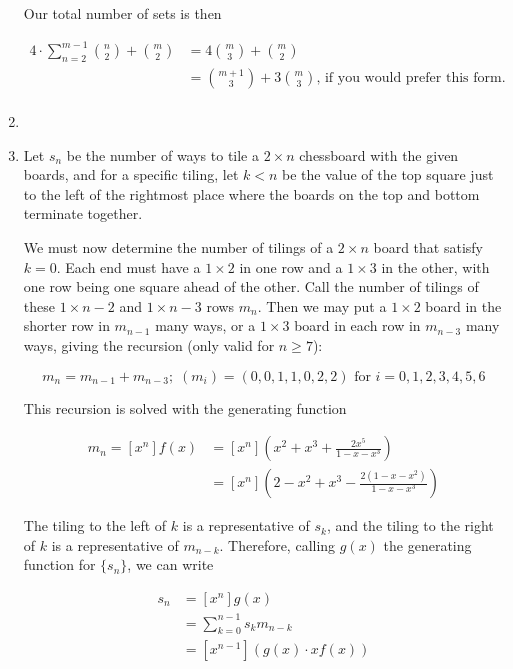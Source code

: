 \documentclass{book}
\numberwithin{equation}{section}
\begin{document}
\begin{enumerate}[label={9.\arabic*}]
Our total number of sets is then

\begin{align*}
4 \cdot \sum_{n = 2}^{m-1} {n \choose 2} + {m \choose 2} & = 4{m \choose 3} + {m \choose 2} \\
& = {m + 1 \choose 3} + 3{m \choose 3} \text{, if you would prefer this form.} \\
\end{align*}

\item

\item


Let $s_n$ be the number of ways to tile a $2 \times n$ chessboard with the given boards, and for a specific tiling,
let $k < n$ be the value of the top square just to the left of the rightmost place where the boards on the top
and bottom terminate together.

We must now determine the number of tilings of a $2 \times n$ board that satisfy $k=0$.
Each end must have a $1 \times 2$ in one row and a $1 \times 3$ in the other,
with one row being one square ahead of the other. Call the number of tilings of these $1 \times n-2$ and
$1 \times n-3$ rows $m_n$. Then we may put a $1 \times 2$ board in the shorter row in $m_{n-1}$ many ways,
or a $1 \times 3$ board in each row in $m_{n-3}$ many ways, giving the recursion (only valid for $n \geq 7$):

$$m_n = m_{n-1} + m_{n-3}; \; (m_i) = (0, 0, 1, 1, 0, 2, 2) \text{ for } i = 0, 1, 2, 3, 4, 5, 6$$

This recursion is solved with the generating function

\begin{align*}
m_n = [x^n]f(x) & = [x^n]\left(x^2 + x^3 + \frac{2x^5}{1 - x - x^3}\right) \\
& = [x^n]\left(2 - x^2 + x^3 - \frac{2(1 - x - x^2)}{1 - x - x^3}\right)
\end{align*}

The tiling to the left of $k$ is a representative of $s_k$, and the tiling to the right of $k$ is a representative of
$m_{n-k}$. Therefore, calling $g(x)$ the generating function for $\{ s_n \}$, we can write

\begin{align*}
s_n & = [x^n]g(x) \\
& = \sum_{k=0}^{n-1} s_k m_{n-k} \\
& = [x^{n-1}] (g(x) \cdot xf(x))
\end{align*}


\end{enumerate}
\end{document}
